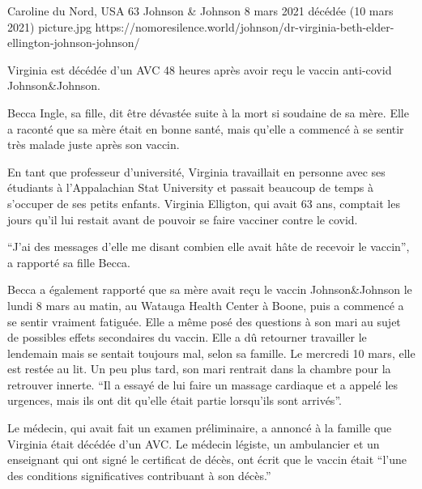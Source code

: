           {Caroline du Nord, USA}
          {63}
          {Johnson \& Johnson}
          {8 mars 2021}
          {décédée (10 mars 2021)}
          {picture.jpg}
          {https://nomoresilence.world/johnson/dr-virginia-beth-elder-ellington-johnson-johnson/}
          {

Virginia est décédée d'un AVC 48 heures après avoir reçu le vaccin anti-covid
Johnson\&Johnson.

Becca Ingle, sa fille, dit être dévastée suite à la mort si soudaine de sa
mère. Elle a raconté que sa mère était en bonne santé, mais qu'elle a commencé à
se sentir très malade juste après son vaccin.

En tant que professeur d'université, Virginia travaillait en personne avec ses
étudiants à l'Appalachian Stat University et passait beaucoup de temps à
s'occuper de ses petits enfants. Virginia Elligton, qui avait 63 ans, comptait
les jours qu'il lui restait avant de pouvoir se faire vacciner contre le covid.

“J'ai des messages d'elle me disant combien elle avait hâte de recevoir le
vaccin”, a rapporté sa fille Becca.

Becca a également rapporté que sa mère avait reçu le vaccin Johnson\&Johnson le
lundi 8 mars au matin, au Watauga Health Center à Boone, puis a commencé a se
sentir vraiment fatiguée. Elle a même posé des questions à son mari au sujet de
possibles effets secondaires du vaccin. Elle a dû retourner travailler le
lendemain mais se sentait toujours mal, selon sa famille. Le mercredi 10 mars,
elle est restée au lit. Un peu plus tard, son mari rentrait dans la chambre pour
la retrouver innerte. “Il a essayé de lui faire un massage cardiaque et a appelé
les urgences, mais ils ont dit qu'elle était partie lorsqu'ils sont arrivés”.

Le médecin, qui avait fait un examen préliminaire, a annoncé à la famille que
Virginia était décédée d'un AVC. Le médecin légiste, un ambulancier et un
enseignant qui ont signé le certificat de décès, ont écrit que le vaccin était
“l'une des conditions significatives contribuant à son décès.”

}
